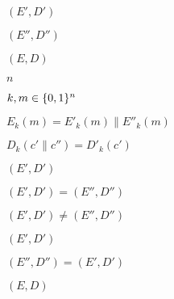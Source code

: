 \documentclass[10pt]{book}
\begin{document}
\begin{mdSnippets}
\begin{mdInlineSnippet}%
$(E',D')$\end{mdInlineSnippet}%
\begin{mdInlineSnippet}[bf1c3f008617dc19e2a47ac023e09625]%
$(E'',D'')$\end{mdInlineSnippet}%
\begin{mdInlineSnippet}[c150726dc018e82825c0c3617f46a1c9]%
$(E,D)$\end{mdInlineSnippet}%
\begin{mdInlineSnippet}[7b8b965ad4bca0e41ab51de7b31363a1]%
$n$\end{mdInlineSnippet}%
\begin{mdInlineSnippet}[260a098e5d3027a9c7adc8d80ed94dc0]%
$k,m\in\{0,1\}^n$\end{mdInlineSnippet}%
\begin{mdInlineSnippet}[b99154895ad09b0c3415503ed8bcbf31]%
$E_k(m)=E'_k(m)\|E''_k(m)$\end{mdInlineSnippet}%
\begin{mdInlineSnippet}[090a1cef8f05fd6388837d85b29d71d1]%
$D_k(c'\|c'')=D'_k(c')$\end{mdInlineSnippet}%
\begin{mdInlineSnippet}%
$(E',D')$\end{mdInlineSnippet}%
\begin{mdInlineSnippet}[992e1f0c382d5562a0ff28a003774ccf]%
$(E',D') = (E'', D'')$\end{mdInlineSnippet}%
\begin{mdInlineSnippet}%
$(E',D') \neq (E'',D'')$\end{mdInlineSnippet}%
\begin{mdInlineSnippet}%
$(E',D')$\end{mdInlineSnippet}%
\begin{mdInlineSnippet}%
$(E'',D'') = (E',D')$\end{mdInlineSnippet}%
\begin{mdInlineSnippet}[c150726dc018e82825c0c3617f46a1c9]%
$(E,D)$\end{mdInlineSnippet}%

\end{mdSnippets}
\end{document}

